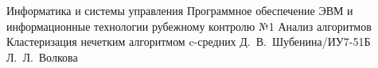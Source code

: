 \makereporttitle
    {Информатика и системы управления} %
    {Программное обеспечение ЭВМ и информационные технологии} %
    {рубежному контролю №1} %
    {Анализ алгоритмов} %
    {Кластеризация нечетким алгоритмом c-средних} %
    {} %
    {Д.~В.~Шубенина/ИУ7-51Б} %
	{Л.~Л.~Волкова} %